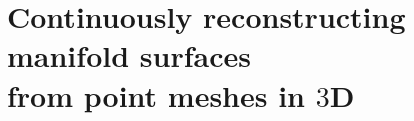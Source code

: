 \section[Continuously reconstructing manifold surfaces from expanding point meshes in 3D]
{Continuously reconstructing manifold surfaces\\\phantom{3.9}  from point meshes in $3$D}
\label{sec:continuously_reconstructing_three_dimensional_manifold_surfaces_from_point_meshes}


